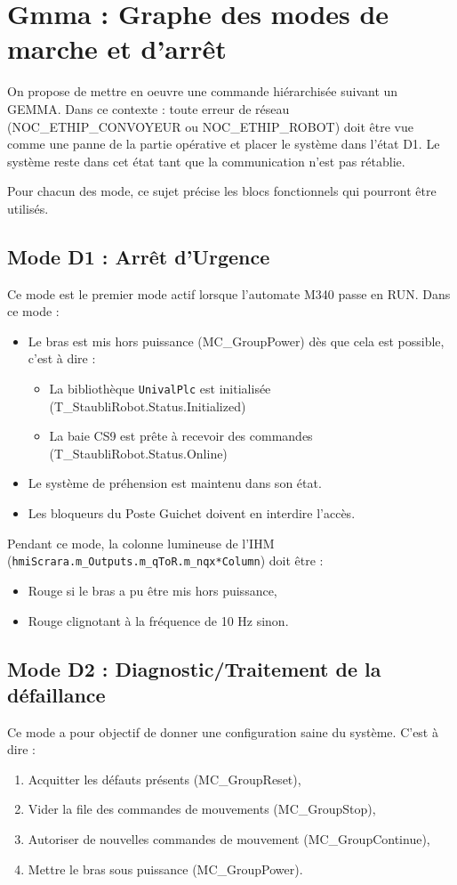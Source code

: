 \section{Gmma : Graphe des modes de marche et d'arrêt}

On propose de mettre en oeuvre une commande hiérarchisée suivant un GEMMA. 
Dans ce contexte : toute erreur de réseau (NOC\_ETHIP\_CONVOYEUR ou NOC\_ETHIP\_ROBOT) doit être vue comme une panne de la partie opérative et placer le système dans l'état D1.
Le système reste dans cet état tant que la communication n'est pas rétablie.

Pour chacun des mode, ce sujet précise les blocs fonctionnels qui pourront être utilisés. 

\subsection{Mode D1 : Arrêt d'Urgence}
Ce mode est le premier mode actif lorsque l'automate M340 passe en RUN.
Dans ce mode : 
\begin{itemize}
    \item Le bras est mis hors puissance (MC\_GroupPower) dès que cela est possible, c'est à dire : 
    \begin{itemize}
        \item La bibliothèque \texttt{UnivalPlc} est initialisée (T\_StaubliRobot.Status.Initialized) 
        \item La baie CS9 est prête à recevoir des commandes (T\_StaubliRobot.Status.Online)
    \end{itemize}
    \item Le système de préhension est maintenu dans son état.
    \item Les bloqueurs du Poste Guichet doivent en interdire l'accès.
\end{itemize}

Pendant ce mode, la colonne lumineuse de l'IHM (\texttt{hmiScrara.m\_Outputs.m\_qToR.m\_nqx*Column}) doit être :
\begin{itemize}
    \item Rouge si le bras a pu être mis hors puissance,
    \item Rouge clignotant à la fréquence de 10 Hz sinon.
\end{itemize}

\subsection{Mode D2 : Diagnostic/Traitement de la défaillance}
Ce mode a pour objectif de donner une configuration saine du système. C'est à dire : 
\begin{enumerate}
    \item Acquitter les défauts présents (MC\_GroupReset),
    \item Vider la file des commandes de mouvements (MC\_GroupStop),
    \item Autoriser de nouvelles commandes de mouvement (MC\_GroupContinue),
    \item Mettre le bras sous puissance (MC\_GroupPower).
\end{enumerate}

